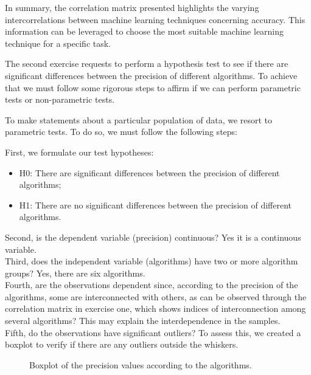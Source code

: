 \documentclass[conference]{IEEEtran}
\begin{document}
In summary, the correlation matrix presented highlights the varying intercorrelations between machine learning techniques concerning accuracy. This information can be leveraged to choose the most suitable machine learning technique for a specific task.

The second exercise requests to perform a hypothesis test to see if there are significant differences between the precision of different algorithms. To achieve that we must follow some rigorous steps to affirm if we can perform parametric tests or non-parametric tests.

To make statements about a particular population of data, we resort to parametric tests. To do so, we must follow the following steps:

First, we formulate our test hypotheses:

\begin{itemize}
    \item H0: There are significant differences between the precision of different algorithms;
    \item H1: There are no significant differences between the precision of different algorithms.\\
\end{itemize}

Second, is the dependent variable (precision) continuous? Yes it is a continuous variable. \\

Third, does the independent variable (algorithms) have two or more algorithm groups? Yes, there are six algorithms. \\

Fourth, are the observations dependent since, according to the precision of the algorithms, some are interconnected with others, as can be observed through the correlation matrix in exercise one, which shows indices of interconnection among several algorithms? This may explain the interdependence in the samples. \\

Fifth, do the observations have significant outliers? To assess this, we created a boxplot to verify if there are any outliers outside the whiskers.

\begin{figure}[H]
    \caption{Boxplot of the precision values according to the algorithms.}
    \label{vehicle_boxplot}
\end{figure}
\end{document}
